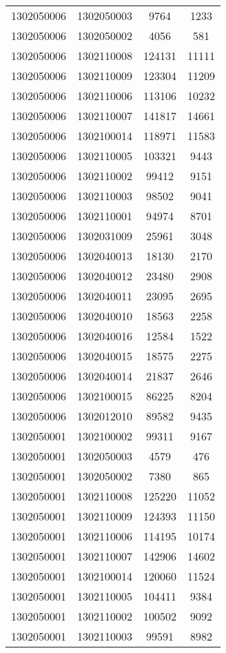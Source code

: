 \begin{longtable}[h]{llcc}
		1302050006 & 1302050003 & 9764 & 1233\\
		1302050006 & 1302050002 & 4056 & 581\\
		1302050006 & 1302110008 & 124131 & 11111\\
		1302050006 & 1302110009 & 123304 & 11209\\
		1302050006 & 1302110006 & 113106 & 10232\\
		1302050006 & 1302110007 & 141817 & 14661\\
		1302050006 & 1302100014 & 118971 & 11583\\
		1302050006 & 1302110005 & 103321 & 9443\\
		1302050006 & 1302110002 & 99412 & 9151\\
		1302050006 & 1302110003 & 98502 & 9041\\
		1302050006 & 1302110001 & 94974 & 8701\\
		1302050006 & 1302031009 & 25961 & 3048\\
		1302050006 & 1302040013 & 18130 & 2170\\
		1302050006 & 1302040012 & 23480 & 2908\\
		1302050006 & 1302040011 & 23095 & 2695\\
		1302050006 & 1302040010 & 18563 & 2258\\
		1302050006 & 1302040016 & 12584 & 1522\\
		1302050006 & 1302040015 & 18575 & 2275\\
		1302050006 & 1302040014 & 21837 & 2646\\
		1302050006 & 1302100015 & 86225 & 8204\\
		1302050006 & 1302012010 & 89582 & 9435\\
		1302050001 & 1302100002 & 99311 & 9167\\
		1302050001 & 1302050003 & 4579 & 476\\
		1302050001 & 1302050002 & 7380 & 865\\
		1302050001 & 1302110008 & 125220 & 11052\\
		1302050001 & 1302110009 & 124393 & 11150\\
		1302050001 & 1302110006 & 114195 & 10174\\
		1302050001 & 1302110007 & 142906 & 14602\\
		1302050001 & 1302100014 & 120060 & 11524\\
		1302050001 & 1302110005 & 104411 & 9384\\
		1302050001 & 1302110002 & 100502 & 9092\\
		1302050001 & 1302110003 & 99591 & 8982\\

\end{longtable}
